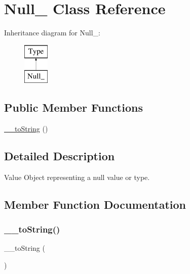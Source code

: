 \hypertarget{classphp_documentor_1_1_reflection_1_1_types_1_1_null__}{}\section{Null\+\_\+ Class Reference}
\label{classphp_documentor_1_1_reflection_1_1_types_1_1_null__}
Inheritance diagram for Null\+\_\+\+:\begin{figure}[H]
\begin{center}
\leavevmode
\includegraphics[height=2.000000cm]{classphp_documentor_1_1_reflection_1_1_types_1_1_null__}
\end{center}
\end{figure}
\subsection*{Public Member Functions}
\begin{DoxyCompactItemize}
\item 
\mbox{\hyperlink{classphp_documentor_1_1_reflection_1_1_types_1_1_null___a7516ca30af0db3cdbf9a7739b48ce91d}{\+\_\+\+\_\+to\+String}} ()
\end{DoxyCompactItemize}


\subsection{Detailed Description}
Value Object representing a null value or type. 

\subsection{Member Function Documentation}
\mbox{\label{classphp_documentor_1_1_reflection_1_1_types_1_1_null___a7516ca30af0db3cdbf9a7739b48ce91d}} 
\subsubsection{\texorpdfstring{\+\_\+\+\_\+to\+String()}{\_\_toString()}}
{\footnotesize\ttfamily \+\_\+\+\_\+to\+String (\begin{DoxyParamCaption}{ }\end{DoxyParamCaption})}

